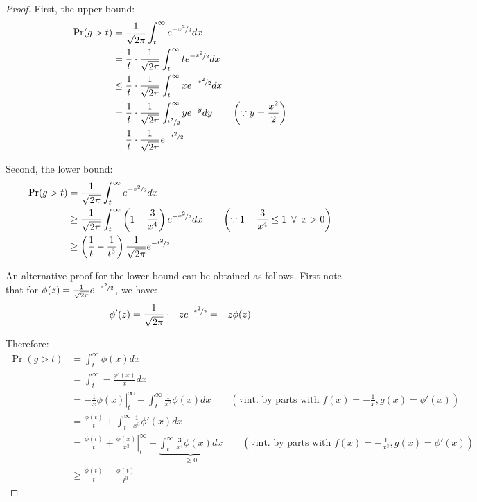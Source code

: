 \documentclass{article}
\theoremstyle{remark}
\begin{document}
\begin{proof}
First, the upper bound:
\begin{align*}
\Pr(g > t) &= \frac{1}{\sqrt{2\pi}}\int_{t}^{\infty} e^{-\nicefrac{x^{2}}{2}} dx \\
&= \frac{1}{t} \cdot \frac{1}{\sqrt{2\pi}}\int_{t}^{\infty} te^{-\nicefrac{x^{2}}{2}} dx \\
&\leq \frac{1}{t} \cdot \frac{1}{\sqrt{2\pi}}\int_{t}^{\infty} xe^{-\nicefrac{x^{2}}{2}} dx \\
&= \frac{1}{t} \cdot \frac{1}{\sqrt{2\pi}}\int_{\nicefrac{t^{2}}{2}}^{\infty} ye^{-y} dy \qquad \left(\because y = \frac{x^{2}}{2}\right)\\
&= \frac{1}{t} \cdot \frac{1}{\sqrt{2\pi}}e^{-\nicefrac{t^{2}}{2}}
\end{align*}

Second, the lower bound:
\begin{align*}
\Pr(g > t) &= \frac{1}{\sqrt{2\pi}}\int_{t}^{\infty} e^{-\nicefrac{x^{2}}{2}} dx \\
&\geq \frac{1}{\sqrt{2\pi}}\int_{t}^{\infty} \left(1 - \frac{3}{x^{4}}\right)e^{-\nicefrac{x^{2}}{2}} dx \qquad \left(\because 1 - \frac{3}{x^{4}} \leq 1 \enskip \forall \enskip x > 0\right) \\
&\geq \left(\frac{1}{t} - \frac{1}{t^{3}}\right)\frac{1}{\sqrt{2\pi}}e^{-\nicefrac{t^{2}}{2}}
\end{align*}

An alternative proof for the lower bound can be obtained as follows. First note that for \(\phi(z) = \frac{1}{\sqrt{2\pi}}e^{-\nicefrac{z^{2}}{2}}\), we have:
\begin{equation*}
\phi'(z) = \frac{1}{\sqrt{2\pi}} \cdot -ze^{\nicefrac{-z^{2}}{2}} = -z\phi(z)
\end{equation*}

Therefore:
\begin{align*}
\Pr(g > t) &= \int_{t}^{\infty} \phi(x) dx \\
&= \int_{t}^{\infty} -\frac{\phi'(x)}{x} dx \\
&= \left. -\frac{1}{x}\phi(x)\right|_{t}^{\infty} - \int_{t}^{\infty} \frac{1}{x^{2}}\phi(x) dx \qquad \left(\because \text{int. by parts with } f(x) = -\frac{1}{x}, g(x) = \phi'(x)\right)\\
&= \frac{\phi(t)}{t} + \int_{t}^{\infty} \frac{1}{x^{3}}\phi'(x) dx \\
&= \frac{\phi(t)}{t} + \left.\frac{\phi(x)}{x^{3}}\right|_{t}^{\infty} + \underbrace{\int_{t}^{\infty} \frac{3}{x^{4}}\phi(x) dx}_{\geq 0} \qquad \left(\because \text{int. by parts with } f(x) = -\frac{1}{x^{3}}, g(x) = \phi'(x)\right)\\
&\geq \frac{\phi(t)}{t} - \frac{\phi(t)}{t^{3}}
\end{align*}
\end{proof}
\end{document}
